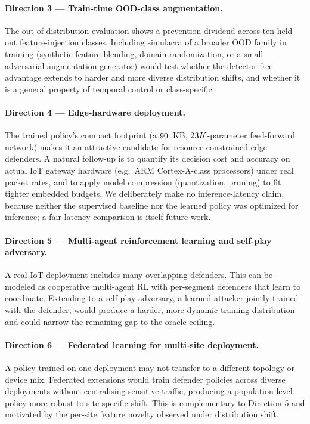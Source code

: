 \paragraph{Direction 3 --- Train-time OOD-class augmentation.} The out-of-distribution evaluation shows a prevention dividend across ten held-out feature-injection classes. Including simulacra of a broader OOD family in training (synthetic feature blending, domain randomization, or a small adversarial-augmentation generator) would test whether the detector-free advantage extends to harder and more diverse distribution shifts, and whether it is a general property of temporal control or class-specific.

\paragraph{Direction 4 --- Edge-hardware deployment.} The trained policy's compact footprint (a $90$~KB, $23K$-parameter feed-forward network) makes it an attractive candidate for resource-constrained edge defenders. A natural follow-up is to quantify its decision cost and accuracy on actual IoT gateway hardware (e.g.\ ARM Cortex-A-class processors) under real packet rates, and to apply model compression (quantization, pruning) to fit tighter embedded budgets. We deliberately make no inference-latency claim, because neither the supervised baseline nor the learned policy was optimized for inference; a fair latency comparison is itself future work.

\paragraph{Direction 5 --- Multi-agent reinforcement learning and self-play adversary.} A real IoT deployment includes many overlapping defenders. This can be modeled as cooperative multi-agent RL with per-segment defenders that learn to coordinate. Extending to a self-play adversary, a learned attacker jointly trained with the defender, would produce a harder, more dynamic training distribution and could narrow the remaining gap to the oracle ceiling.

\paragraph{Direction 6 --- Federated learning for multi-site deployment.} A policy trained on one deployment may not transfer to a different topology or device mix. Federated extensions would train defender policies across diverse deployments without centralising sensitive traffic, producing a population-level policy more robust to site-specific shift. This is complementary to Direction 5 and motivated by the per-site feature novelty observed under distribution shift.


